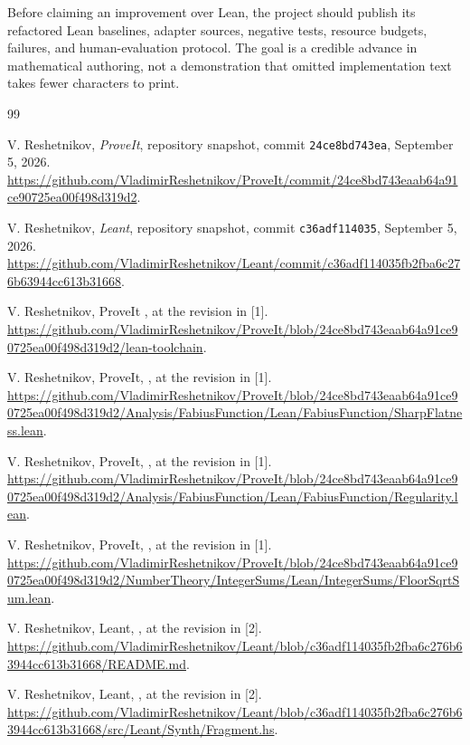 \documentclass[11pt,a4paper]{article}
\theoremstyle{definition}
\theoremstyle{remark}
\begin{document}
Before claiming an improvement over Lean, the project should publish its refactored Lean baselines, adapter sources, negative tests, resource budgets, failures, and human-evaluation protocol. The goal is a credible advance in mathematical authoring, not a demonstration that omitted implementation text takes fewer characters to print.

\begin{thebibliography}{99}
\small
{}
V. Reshetnikov, \emph{ProveIt}, repository snapshot, commit \texttt{24ce8bd743ea}, September 5, 2026.
\url{https://github.com/VladimirReshetnikov/ProveIt/commit/24ce8bd743eaab64a91ce90725ea00f498d319d2}.

V. Reshetnikov, \emph{Leant}, repository snapshot, commit \texttt{c36adf114035}, September 5, 2026.
\url{https://github.com/VladimirReshetnikov/Leant/commit/c36adf114035fb2fba6c276b63944cc613b31668}.

V. Reshetnikov, ProveIt , at the revision in [1].
\url{https://github.com/VladimirReshetnikov/ProveIt/blob/24ce8bd743eaab64a91ce90725ea00f498d319d2/lean-toolchain}.

V. Reshetnikov, ProveIt, , at the revision in [1].
\url{https://github.com/VladimirReshetnikov/ProveIt/blob/24ce8bd743eaab64a91ce90725ea00f498d319d2/Analysis/FabiusFunction/Lean/FabiusFunction/SharpFlatness.lean}.

V. Reshetnikov, ProveIt, , at the revision in [1].
\url{https://github.com/VladimirReshetnikov/ProveIt/blob/24ce8bd743eaab64a91ce90725ea00f498d319d2/Analysis/FabiusFunction/Lean/FabiusFunction/Regularity.lean}.

V. Reshetnikov, ProveIt, , at the revision in [1].
\url{https://github.com/VladimirReshetnikov/ProveIt/blob/24ce8bd743eaab64a91ce90725ea00f498d319d2/NumberTheory/IntegerSums/Lean/IntegerSums/FloorSqrtSum.lean}.

V. Reshetnikov, Leant, , at the revision in [2].
\url{https://github.com/VladimirReshetnikov/Leant/blob/c36adf114035fb2fba6c276b63944cc613b31668/README.md}.

V. Reshetnikov, Leant, , at the revision in [2].
\url{https://github.com/VladimirReshetnikov/Leant/blob/c36adf114035fb2fba6c276b63944cc613b31668/src/Leant/Synth/Fragment.hs}.


\end{thebibliography}
\end{document}
